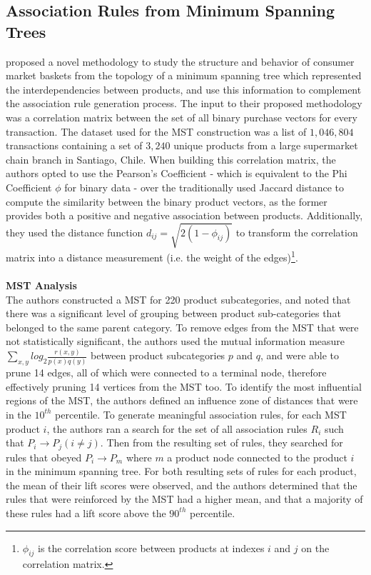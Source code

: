\subsection{Association Rules from Minimum Spanning Trees}
\label{sec:mst paper}
 proposed a novel methodology to study the structure and behavior of consumer market baskets from the topology of a minimum spanning tree which represented the interdependencies between products, and use this information to complement the association rule generation process. The input to their proposed methodology was a correlation matrix between the set of all binary purchase vectors for every transaction.  The dataset used for the MST construction was a list of $1,046,804$ transactions containing a set of $3,240$ unique products from a large supermarket chain branch in Santiago, Chile.  When building this correlation matrix, the authors opted to use the Pearson's Coefficient  - which is equivalent to the Phi Coefficient $\phi$ for binary data  - over the traditionally used Jaccard distance to compute the similarity between the binary product vectors, as the former provides both a positive and negative association between products. Additionally,  they used the distance function $d_{ij} = \sqrt{2(1-\phi_{ij})}$ to transform the correlation matrix into a distance measurement (i.e. the weight of the edges)\footnote{$\phi_{ij}$ is the correlation score between products at indexes $i$ and $j$ on the correlation matrix.}. 
\\\\\textbf{MST Analysis}\\
The authors constructed a MST for 220 product subcategories, and noted that there was a significant level of grouping between product sub-categories that belonged to the same parent category.  To remove edges from the MST that were not statistically significant,  the authors used the mutual information measure  $\sum\limits_{x,y}log_2 \frac{r(x,y)}{p(x)q(y)}$ between product subcategories $p$ and $q$, and were able to prune 14 edges, all of which were connected to a terminal node, therefore effectively pruning 14 vertices from the MST too. To identify the most influential regions of the MST, the authors defined an influence zone of distances that were in the $10^{th}$ percentile. To generate meaningful association rules,  for each MST product $i$, the authors ran a search for the set of all association rules $R_i$ such that $P_i \rightarrow P_j (i \neq j)$. Then from the resulting set of rules, they searched for rules that obeyed $P_i \rightarrow P_m$ where $m$ a product node connected to the product $i$ in the minimum spanning tree.  For both resulting sets of rules for each product, the mean of their lift scores were observed, and the authors determined that the rules that were reinforced by the MST had a higher mean, and that a majority of these rules had a lift score above the $90^{th}$ percentile. 
